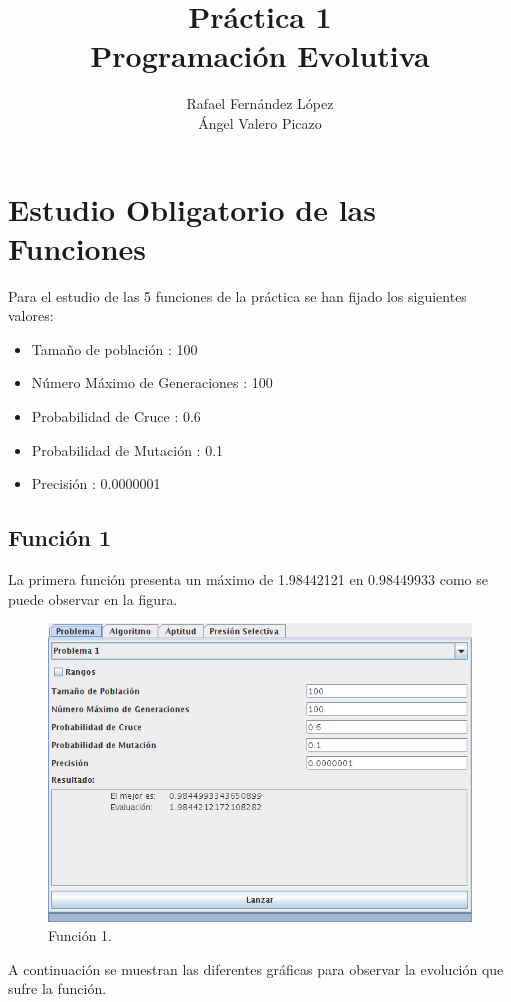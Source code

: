 \documentclass[12pt]{article}
\title{Práctica 1\\Programación Evolutiva}
\author{Rafael Fernández López\\Ángel Valero Picazo}
\date{}
\begin{document}
\maketitle
\newpage
\newpage
\tableofcontents
\newpage

\section{Estudio Obligatorio de las Funciones}	
	Para el estudio de las 5 funciones de la práctica se han fijado los siguientes valores:
	\begin{itemize}
		\item Tamaño de población : 100
		\item Número Máximo de Generaciones : 100
		\item Probabilidad de Cruce : 0.6
		\item Probabilidad de Mutación : 0.1
		\item Precisión : 0.0000001
	\end{itemize}

\subsection{Función 1}
	La primera función presenta un máximo de 1.98442121 en 0.98449933 como se puede observar en la figura.
\begin{figure}[H]
\centering
\includegraphics[scale=0.4]{graficas/F1inicial}
\caption{Función 1.}
\label{fig}
\end{figure}
	A continuación se muestran las diferentes gráficas para observar la evolución que sufre la función.
\end{document}
